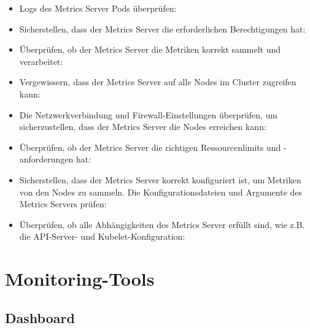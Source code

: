 \begin{itemize}
    \item Logs des Metrics Server Pods überprüfen:
    
    
    \item Sicherstellen, dass der Metrics Server die erforderlichen Berechtigungen hat:
    
    
    \item Überprüfen, ob der Metrics Server die Metriken korrekt sammelt und verarbeitet:
    

    \item Vergewissern, dass der Metrics Server auf alle Nodes im Cluster zugreifen kann:
    

    \item Die Netzwerkverbindung und Firewall-Einstellungen überprüfen, um sicherzustellen, dass der Metrics Server die Nodes erreichen kann:
    

    \item Überprüfen, ob der Metrics Server die richtigen Ressourcenlimits und -anforderungen hat:
    
    
    \item Sicherstellen, dass der Metrics Server korrekt konfiguriert ist, um Metriken von den Nodes zu sammeln. Die Konfigurationsdateien und Argumente des Metrics Servers prüfen:
    
    
    \item Überprüfen, ob alle Abhängigkeiten des Metrics Server erfüllt sind, wie z.B. die API-Server- und Kubelet-Konfiguration:
    
\end{itemize}

\newpage

\section{Monitoring-Tools}
\subsection{Dashboard}
